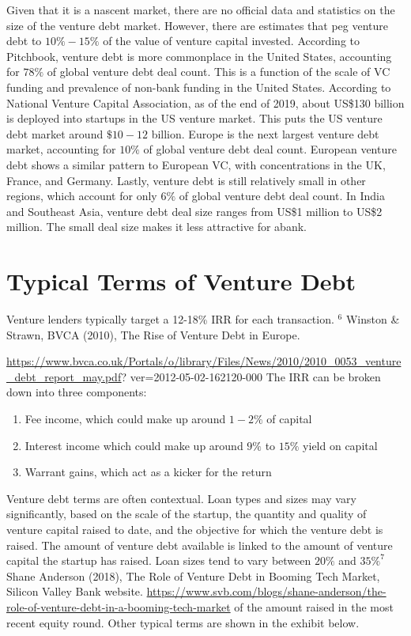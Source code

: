 \documentclass[11pt]{article}
\begin{document}
Given that it is a nascent market, there are no official data and statistics on the size of the venture debt market. However, there are estimates that peg venture debt to $10 \%-15 \%$ of the value of venture capital invested. According to Pitchbook, venture debt is more commonplace in the United States, accounting for $78 \%$ of global venture debt deal count. This is a function of the scale of VC funding and prevalence of non-bank funding in the United States. According to National Venture Capital Association, as of the end of 2019, about US\$130 billion is deployed into startups in the US venture market. This puts the US venture debt market around $\$ 10-12$ billion. Europe is the next largest venture debt market, accounting for $10 \%$ of global venture debt deal count. European venture debt shows a similar pattern to European VC, with concentrations in the UK, France, and Germany. Lastly, venture debt is still relatively small in other regions, which account for only $6 \%$ of global venture debt deal count. In India and Southeast Asia, venture debt deal size ranges from US\$1 million to US\$2 million. The small deal size makes it less attractive for abank.

\section*{Typical Terms of Venture Debt}
Venture lenders typically target a 12-18\% IRR for each transaction. ${ }^{6}$ Winston \& Strawn, BVCA (2010), The Rise of Venture Debt in Europe.

\href{https://www.bvca.co.uk/Portals/o/library/Files/News/2010/2010_0053_venture_debt_report_may.pdf}{https://www.bvca.co.uk/Portals/o/library/Files/News/2010/2010\_0053\_venture\_debt\_report\_may.pdf}? ver=2012-05-02-162120-000 The IRR can be broken down into three components:

\begin{enumerate}
  \item Fee income, which could make up around $1-2 \%$ of capital

  \item Interest income which could make up around $9 \%$ to $15 \%$ yield on capital

  \item Warrant gains, which act as a kicker for the return

\end{enumerate}

Venture debt terms are often contextual. Loan types and sizes may vary significantly, based on the scale of the startup, the quantity and quality of venture capital raised to date, and the objective for which the venture debt is raised. The amount of venture debt available is linked to the amount of venture capital the startup has raised. Loan sizes tend to vary between $20 \%$ and $35 \%^{7}$ Shane Anderson (2018), The Role of Venture Debt in Booming Tech Market, Silicon Valley Bank website. \href{https://www.svb.com/blogs/shane-anderson/the-role-of-venture-debt-in-a-booming-tech-market}{https://www.svb.com/blogs/shane-anderson/the-role-of-venture-debt-in-a-booming-tech-market} of the amount raised in the most recent equity round. Other typical terms are shown in the exhibit below.
\end{document}
